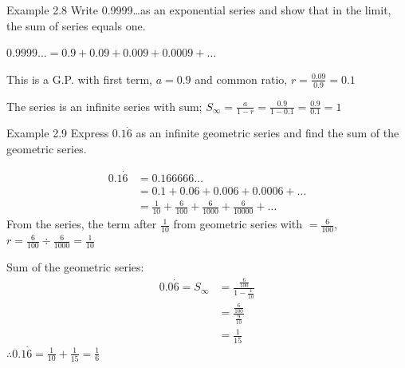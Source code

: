 \begin{example}{Example 2.8}
Write 0.9999\ldots as an exponential series and show that in the limit, the sum of
series equals one.

\solution
$0.9999\ldots = 0.9 + 0.09 + 0.009 + 0.0009 + \ldots$

This is a G.P. with first term, $a = 0.9$ and common ratio, $r = \frac{0.09}{0.9} = 0.1$

The series is an infinite series with sum; $S_\infty = \frac{a}{1 - r} = \frac{0.9}{1 - 0.1}
= \frac{0.9}{0.1} = 1$
\end{example}

\begin{example}{Example 2.9}
Express $0.1\dot{6}$ as an infinite geometric series and find the sum of the geometric
series.

\solution
\begin{align*}
  0.1\dot{6} &= 0.166666\ldots \\
  &= 0.1 + 0.06 + 0.006 + 0.0006 + \ldots \\
  &= \frac{1}{10} + \frac{6}{100} + \frac{6}{1000} + \frac{6}{10000} + \ldots
\end{align*}
From the series, the term after $\frac{1}{10}$ from geometric series with $= \frac{6}{100}$,
$r = \frac{6}{100} \div \frac{6}{1000} = \frac{1}{10}$

Sum of the geometric series:
\begin{align*}
  0.0\dot{6} = S_\infty &= \frac{\frac{6}{100}}{1 - \frac{1}{10}} \\
  &= \frac{\frac{6}{100}}{\frac{9}{10}} \\
  &= \frac{1}{15}
\end{align*}
$\therefore 0.1\dot{6} = \frac{1}{10} + \frac{1}{15} = \frac{1}{6}$
\end{example}

